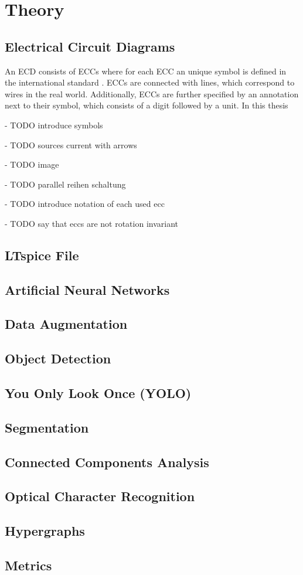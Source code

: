\chapter{Theory}

\section{Electrical Circuit Diagrams}

An \ac{ECD} consists of \acp{ECC} where for each \ac{ECC} an unique symbol is defined in the international standard \cite{iec60617}.
\acp{ECC} are connected with lines, which correspond to wires in the real world.
Additionally, \acp{ECC} are further specified by an annotation next to their symbol, which consists of a digit followed by a unit.
In this thesis

- TODO introduce symbols

- TODO sources current with arrows

- TODO image

- TODO parallel reihen schaltung

- TODO introduce notation of each used ecc

- TODO say that eccs are not rotation invariant

\section{LTspice File}


\section{Artificial Neural Networks}


\section{Data Augmentation}

\section{Object Detection}


\section{You Only Look Once (YOLO)}


\section{Segmentation}


\section{Connected Components Analysis}


\section{Optical Character Recognition}

\section{Hypergraphs}


\section{Metrics}
